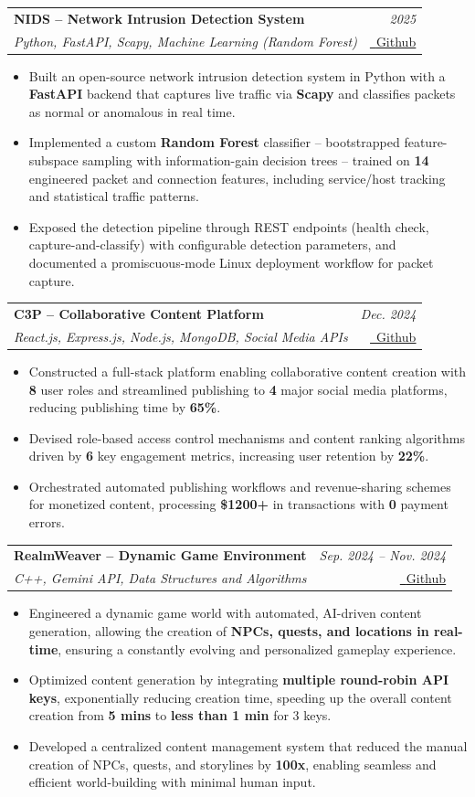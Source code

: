 \documentclass[letterpaper,10pt]{article}
\makeatletter
\newcommand{\resumeItem}[1]{
  \item\small{
    {#1 \vspace{-1mm}}
  }
}
\newcommand{\resumeProject}[4]{
  \item
    \begin{tabular*}{0.97\textwidth}[t]{l@{\extracolsep{\fill}}r}
      \textbf{\small #1} & \textit{\small #3} \\
      \textit{\small #2} & \small #4 \\
    \end{tabular*}\vspace{-7pt}
}
\newcommand{\resumeItemListStart}{\begin{itemize}}
\newcommand{\resumeItemListEnd}{\end{itemize}\vspace{-5pt}}
\makeatother
\begin{document}
      \resumeProject
        {NIDS -- Network Intrusion Detection System}
        {Python, FastAPI, Scapy, Machine Learning (Random Forest)}
        {2025}
        {\href{https://github.com/aradhya2708/nids}{\faGithub \ \underline{Github}}}
        \resumeItemListStart
          \resumeItem{Built an open-source network intrusion detection system in Python with a \textbf{FastAPI} backend that captures live traffic via \textbf{Scapy} and classifies packets as normal or anomalous in real time.}
          \resumeItem{Implemented a custom \textbf{Random Forest} classifier -- bootstrapped feature-subspace sampling with information-gain decision trees -- trained on \textbf{14} engineered packet and connection features, including service/host tracking and statistical traffic patterns.}
          \resumeItem{Exposed the detection pipeline through REST endpoints (health check, capture-and-classify) with configurable detection parameters, and documented a promiscuous-mode Linux deployment workflow for packet capture.}
        \resumeItemListEnd

      \resumeProject
        {C3P -- Collaborative Content Platform}
        {React.js, Express.js, Node.js, MongoDB, Social Media APIs}
        {Dec. 2024}
        {\href{https://github.com/Aradhya2708/larv}{\faGithub \ \underline{Github}}}
        \resumeItemListStart
          \resumeItem{Constructed a full-stack platform enabling collaborative content creation with \textbf{8} user roles and streamlined publishing to \textbf{4} major social media platforms, reducing publishing time by \textbf{65\%}.}
          \resumeItem{Devised role-based access control mechanisms and content ranking algorithms driven by \textbf{6} key engagement metrics, increasing user retention by \textbf{22\%}.}
          \resumeItem{Orchestrated automated publishing workflows and revenue-sharing schemes for monetized content, processing \textbf{\$1200+} in transactions with \textbf{0} payment errors.}
        \resumeItemListEnd

      \resumeProject
        {RealmWeaver -- Dynamic Game Environment}
        {C++, Gemini API, Data Structures and Algorithms}
        {Sep. 2024 -- Nov. 2024}
        {\href{https://github.com/lakshyajain-0291/RealmWeaver}{\faGithub \ \underline{Github}}}
        \resumeItemListStart
          \resumeItem{Engineered a dynamic game world with automated, AI-driven content generation, allowing the creation of \textbf{NPCs, quests, and locations in real-time}, ensuring a constantly evolving and personalized gameplay experience.}
          \resumeItem{Optimized content generation by integrating \textbf{multiple round-robin API keys}, exponentially reducing creation time, speeding up the overall content creation from \textbf{5 mins} to \textbf{less than 1 min} for 3 keys.}
          \resumeItem{Developed a centralized content management system that reduced the manual creation of NPCs, quests, and storylines by \textbf{100x}, enabling seamless and efficient world-building with minimal human input.}
        \resumeItemListEnd
\end{document}
